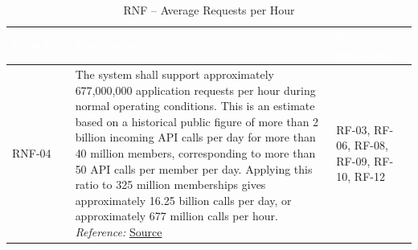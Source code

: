 \documentclass{article}
\begin{document}

\begin{table}[H]

\centering

\small

\renewcommand{\arraystretch}{1.35}

\caption{RNF -- Average Requests per Hour}

\label{tab:rnf_average_requests}

\begin{tabularx}{\textwidth}{|p{2.2cm}|X|p{3.5cm}|}

\hline

\rowcolor[HTML]{1F2937}

\textcolor{white}{\textbf{Identifier}} &
\textcolor{white}{\textbf{Description}} &
\textcolor{white}{\textbf{RF associated}} \\ \hline

RNF-04 &
The system shall support approximately 677{,}000{,}000 application requests per hour during normal operating conditions. This is an estimate based on a historical public figure of more than 2 billion incoming API calls per day for more than 40 million members, corresponding to more than 50 API calls per member per day. Applying this ratio to 325 million memberships gives approximately 16.25 billion calls per day, or approximately 677 million calls per hour.
\textit{Reference:} \href{https://speakerdeck.com/benjchristensen/evolution-of-the-netflix-api-qcon-sf-2013}{Source}
&
RF-03, RF-06, RF-08, RF-09, RF-10, RF-12 \\ \hline

\end{tabularx}

\end{table}


\end{document}
